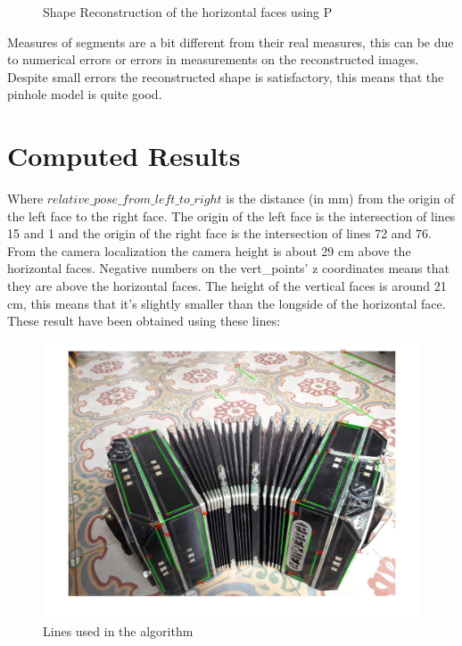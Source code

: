 \documentclass[11pt, oneside]{article}   	%
\begin{document}
\begin{figure}
 \centering
    \qquad
    \caption{Shape Reconstruction of the horizontal faces using P}%
    \label{hor_sr}%
\end{figure}
Measures of segments are a bit different from their real measures, this can be due to numerical errors or errors in measurements on the reconstructed images.
Despite small errors the reconstructed shape is satisfactory, this means that the pinhole model is quite good.
 
\section{Computed Results}

Where $relative\_pose\_from\_left\_to\_right$ is the distance (in mm) from the origin of the left face to the right face. The origin of the left face is the intersection of lines 15 and 1 and the origin of the right face is the intersection of lines 72 and 76.
From the camera localization the camera height is about 29 cm above the horizontal faces. 
Negative numbers on the vert\_points' z coordinates means that they are above the horizontal faces. The height of the vertical faces is around 21 cm, this means that it's slightly smaller than the longside of the horizontal face. 
These result have been obtained using these lines:
\begin{figure}[!b]

\includegraphics[width=0.6\linewidth]{used_lines.jpg}

\caption{Lines used in the algorithm}

\end{figure}
\end{document}
